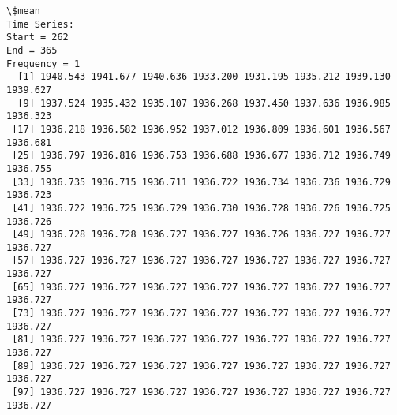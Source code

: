 \documentclass[11pt]{article}
\begin{document}
    \begin{Verbatim}[commandchars=\\\{\}]
\$mean
Time Series:
Start = 262 
End = 365 
Frequency = 1 
  [1] 1940.543 1941.677 1940.636 1933.200 1931.195 1935.212 1939.130 1939.627
  [9] 1937.524 1935.432 1935.107 1936.268 1937.450 1937.636 1936.985 1936.323
 [17] 1936.218 1936.582 1936.952 1937.012 1936.809 1936.601 1936.567 1936.681
 [25] 1936.797 1936.816 1936.753 1936.688 1936.677 1936.712 1936.749 1936.755
 [33] 1936.735 1936.715 1936.711 1936.722 1936.734 1936.736 1936.729 1936.723
 [41] 1936.722 1936.725 1936.729 1936.730 1936.728 1936.726 1936.725 1936.726
 [49] 1936.728 1936.728 1936.727 1936.727 1936.726 1936.727 1936.727 1936.727
 [57] 1936.727 1936.727 1936.727 1936.727 1936.727 1936.727 1936.727 1936.727
 [65] 1936.727 1936.727 1936.727 1936.727 1936.727 1936.727 1936.727 1936.727
 [73] 1936.727 1936.727 1936.727 1936.727 1936.727 1936.727 1936.727 1936.727
 [81] 1936.727 1936.727 1936.727 1936.727 1936.727 1936.727 1936.727 1936.727
 [89] 1936.727 1936.727 1936.727 1936.727 1936.727 1936.727 1936.727 1936.727
 [97] 1936.727 1936.727 1936.727 1936.727 1936.727 1936.727 1936.727 1936.727


\end{Verbatim}
\end{document}
